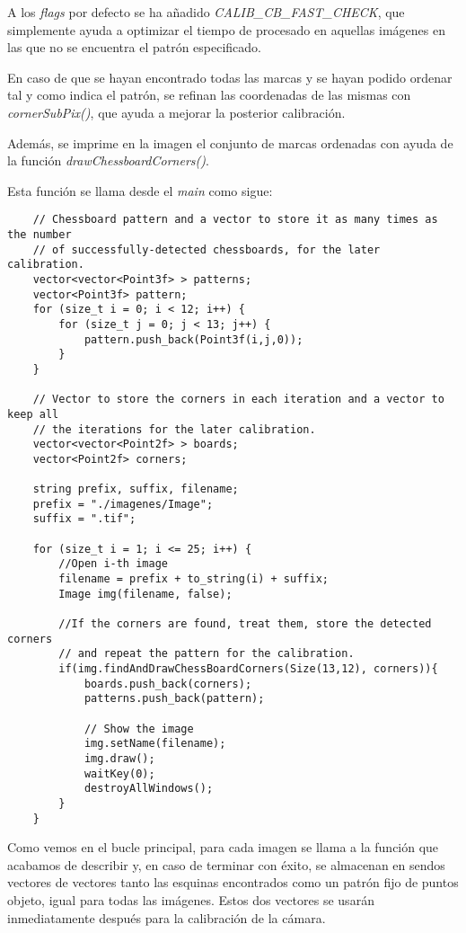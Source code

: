 \documentclass[a4paper, 11pt]{article}
\theoremstyle{definition}
\theoremstyle{theorem}
\begin{document}
    A los \emph{flags} por defecto se ha añadido \emph{CALIB\_CB\_FAST\_CHECK}, que simplemente ayuda a optimizar el tiempo de procesado en aquellas imágenes en las que no se encuentra el patrón especificado.

    En caso de que se hayan encontrado todas las marcas y se hayan podido ordenar tal y como indica el patrón, se refinan las coordenadas de las mismas con \emph{cornerSubPix()}, que ayuda a mejorar la posterior calibración.

    Además, se imprime en la imagen el conjunto de marcas ordenadas con ayuda de la función \emph{drawChessboardCorners()}.

    Esta función se llama desde el \emph{main} como sigue:

    \begin{lstlisting}
    // Chessboard pattern and a vector to store it as many times as the number
    // of successfully-detected chessboards, for the later calibration.
    vector<vector<Point3f> > patterns;
    vector<Point3f> pattern;
    for (size_t i = 0; i < 12; i++) {
        for (size_t j = 0; j < 13; j++) {
            pattern.push_back(Point3f(i,j,0));
        }
    }

    // Vector to store the corners in each iteration and a vector to keep all
    // the iterations for the later calibration.
    vector<vector<Point2f> > boards;
    vector<Point2f> corners;

    string prefix, suffix, filename;
    prefix = "./imagenes/Image";
    suffix = ".tif";

    for (size_t i = 1; i <= 25; i++) {
        //Open i-th image
        filename = prefix + to_string(i) + suffix;
        Image img(filename, false);

        //If the corners are found, treat them, store the detected corners
        // and repeat the pattern for the calibration.
        if(img.findAndDrawChessBoardCorners(Size(13,12), corners)){
            boards.push_back(corners);
            patterns.push_back(pattern);

            // Show the image
            img.setName(filename);
            img.draw();
            waitKey(0);
            destroyAllWindows();
        }
    }
    \end{lstlisting}

    Como vemos en el bucle principal, para cada imagen se llama a la función que acabamos de describir y, en caso de terminar con éxito, se almacenan en sendos vectores de vectores tanto las esquinas encontrados como un patrón fijo de puntos objeto, igual para todas las imágenes. Estos dos vectores se usarán inmediatamente después para la calibración de la cámara.
\end{document}

